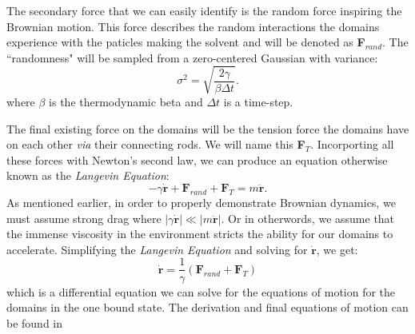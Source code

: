 The secondary force that we can easily identify is the random force inspiring the Brownian motion. This force describes the random interactions the domains experience with the paticles making the solvent and will be denoted as \textbf{F}$_{rand}$. The ``randomness" will be sampled from a zero-centered Gaussian with variance:
\begin{equation}
	\sigma^2=\sqrt{\frac{2\gamma}{\beta\Delta t}}.
\end{equation}
where $\beta$ is the thermodynamic beta and $\Delta t$ is a time-step. 

The final existing force on the domains will be the tension force the domains have on each other \textit{via} their connecting rods. We will name this \textbf{F}$_T$. Incorporting all these forces with Newton's second law, we can produce an equation otherwise known as the \textit{Langevin Equation}:
\begin{equation}
	-\gamma \dot{\textbf{r}} + \textbf{F}_{rand} + \textbf{F}_T = m\ddot{\textbf{r}}.
\end{equation}
As mentioned earlier, in order to properly demonstrate Brownian dynamics, we must assume strong drag where $|\gamma \dot{\textbf{r}}|\ll |m\ddot{\textbf{r}}|$. Or in otherwords, we assume that the immense viscosity in the environment stricts the ability for our domains to accelerate. Simplifying the \textit{Langevin Equation} and solving for $\dot{\textbf{r}}$, we get:
\begin{equation}
	\dot{\textbf{r}}=\frac{1}{\gamma}(\textbf{F}_{rand} + \textbf{F}_T)
\end{equation}
which is a differential equation we can solve for the equations of motion for the domains in the one bound state. The derivation and final equations of motion can be found in \cite{Capek2017, W}


